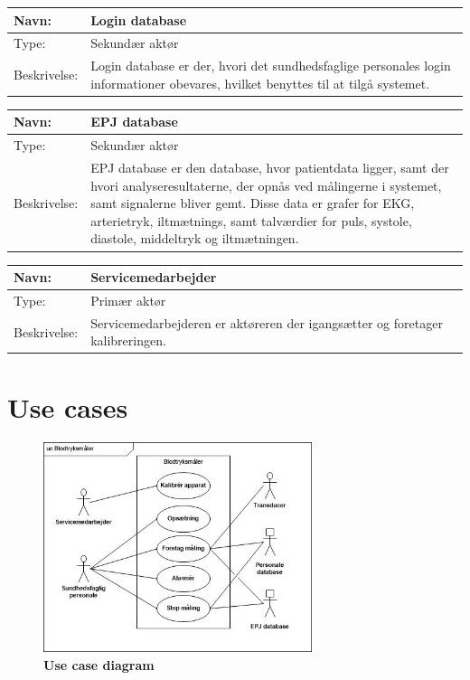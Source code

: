 \begin{table}[h!]
\begin{tabular}{| >{\raggedright\arraybackslash}p{3cm} | >{\raggedright\arraybackslash}p{12cm} |}
   \hline
   Navn: & Login database\\ \hline
   Type: & Sekundær aktør \\ \hline
   Beskrivelse: & Login database er der, hvori det sundhedsfaglige personales login informationer obevares, hvilket benyttes til at tilgå systemet. \\ \hline
\end{tabular}
\end{table}


\begin{table}[h!]
\begin{tabular}{| >{\raggedright\arraybackslash}p{3cm} | >{\raggedright\arraybackslash}p{12cm} |}
   \hline
   Navn: & EPJ database\\ \hline
   Type: & Sekundær aktør \\ \hline
   Beskrivelse: & EPJ database er den database, hvor patientdata ligger, samt der hvori analyseresultaterne, der opnås ved målingerne i systemet, samt signalerne bliver gemt. Disse data er grafer for EKG, arterietryk, iltmætnings, samt talværdier for puls, systole, diastole, middeltryk og iltmætningen.\\ \hline
\end{tabular}
\end{table}

\begin{table}[h!]
\begin{tabular}{| >{\raggedright\arraybackslash}p{3cm} | >{\raggedright\arraybackslash}p{12cm} |}
   \hline
   Navn: & Servicemedarbejder\\ \hline
   Type: & Primær aktør \\ \hline
   Beskrivelse: & Servicemedarbejderen er aktøreren der igangsætter og foretager kalibreringen.\\ \hline
\end{tabular}
\end{table}

\newpage

\section{Use cases}
\begin{figure}[h!]
\includegraphics[width =0.7\textwidth , center]{billeder/UCdiagram}
\caption{\textbf{Use case diagram}}
\end{figure}

